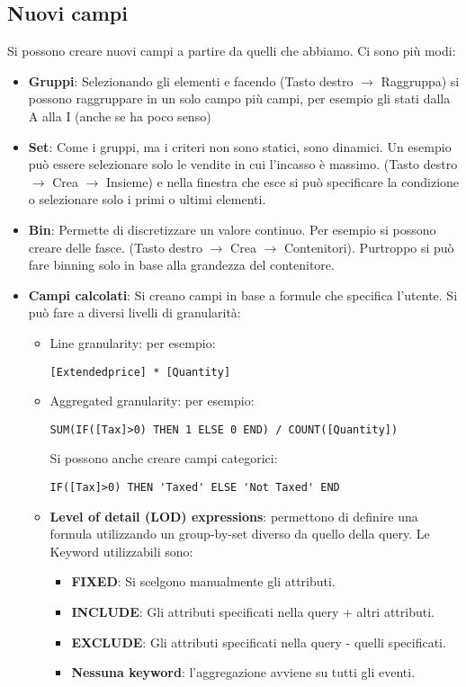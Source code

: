 \subsection{Nuovi campi}
Si possono creare nuovi campi a partire da quelli che abbiamo. Ci sono più modi:
\begin{itemize}
	\item \textbf{Gruppi}: Selezionando gli elementi e facendo (Tasto destro $\xrightarrow{}$ Raggruppa) si possono raggruppare in un solo campo più campi, per esempio gli stati dalla A alla I (anche se ha poco senso)
	\item \textbf{Set}: Come i gruppi, ma i criteri non sono statici, sono dinamici. Un esempio può essere selezionare solo le vendite in cui l'incasso è massimo. (Tasto destro $\xrightarrow{}$ Crea $\xrightarrow{}$ Insieme) e nella finestra che esce si può specificare la condizione o selezionare solo i primi o ultimi elementi.
	\item \textbf{Bin}: Permette di discretizzare un valore continuo. Per esempio si possono creare delle fasce. (Tasto destro $\xrightarrow{}$ Crea $\xrightarrow{}$ Contenitori). Purtroppo si può fare binning solo in base alla grandezza del contenitore.
	\item \textbf{Campi calcolati}: Si creano campi in base a formule che specifica l'utente. Si può fare a diversi livelli di granularità:
	\begin{itemize}
		\item Line granularity: per esempio:
		\begin{verbatim}
[Extendedprice] * [Quantity]
		\end{verbatim}
		\item Aggregated granularity: per esempio:\newline
		\begin{verbatim}
SUM(IF([Tax]>0) THEN 1 ELSE 0 END) / COUNT([Quantity])
		\end{verbatim}
		Si possono anche creare campi categorici:
		\begin{verbatim}
IF([Tax]>0) THEN 'Taxed' ELSE 'Not Taxed' END
		\end{verbatim}
		\item\textbf{ Level of detail (LOD) expressions}: permettono di definire una formula utilizzando un group-by-set diverso da quello della query. Le Keyword utilizzabili sono:
		\begin{itemize}
			\item \textbf{FIXED}: Si scelgono manualmente gli attributi.
			\item \textbf{INCLUDE}: Gli attributi specificati nella query + altri attributi.
			\item \textbf{EXCLUDE}: Gli attributi specificati nella query - quelli specificati.
			\item \textbf{Nessuna keyword}: l'aggregazione avviene su tutti gli eventi.
		\end{itemize}
	\end{itemize}
\end{itemize}
\newpage
